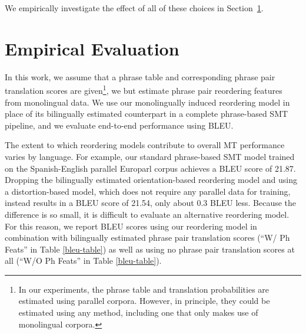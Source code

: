 \documentclass[11pt,letterpaper]{article}
\newcommand{\todo}[1]{\textcolor{red}{TODO: #1}}
\newcommand{\secref}[1]{Section~\ref{#1}}
\begin{document}
We empirically investigate the effect of all of these choices in \secref{sect:eval}.

\section{Empirical Evaluation} \label{sect:eval}

In this work, we assume that a phrase table and corresponding phrase pair translation scores are given\footnote{In our experiments, the phrase table and translation probabilities are estimated using parallel corpora. However, in principle, they could be estimated using any method, including one that only makes use of monolingual corpora.}, we but estimate phrase pair reordering features from monolingual data.  We use our monolingually induced reordering model in place of its bilingually estimated counterpart in a complete phrase-based SMT pipeline, and we evaluate end-to-end performance using BLEU. 

The extent to which reordering models contribute to overall MT performance varies by language. For example, our standard phrase-based SMT model trained on the Spanish-English parallel Europarl corpus achieves a BLEU score of 21.87. Dropping the bilingually estimated orientation-based reordering model and using a distortion-based model, which does not require any parallel data for training, instead results in a BLEU score of 21.54, only about 0.3 BLEU less. Because the difference is so small, it is difficult to evaluate an alternative reordering model. For this reason, we report BLEU scores using our reordering model in combination with bilingually estimated phrase pair translation scores (``W/ Ph Feats'' in Table \ref{bleu-table}) as well as using no phrase pair translation scores at all (``W/O Ph Feats'' in Table \ref{bleu-table}). 

\end{document}
